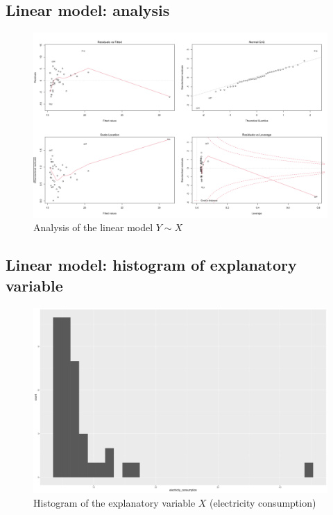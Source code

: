 \subsection{Linear model: analysis}

\begin{figure}[H]
  \centering
  \includegraphics[width=\textwidth]{figures/png/lm_analysis.png}
  \caption{Analysis of the linear model $Y \sim X$}
  \label{fig:analysis-linear-model}
\end{figure}

\subsection{Linear model: histogram of explanatory variable}

\begin{figure}[H]
  \centering
  \includegraphics[width=\textwidth]{figures/png/histogram_explanatory_variable.png}
  \caption{Histogram of the explanatory variable $X$ (electricity consumption)}
  \label{fig:histogram-explanatory-variable}
\end{figure}

